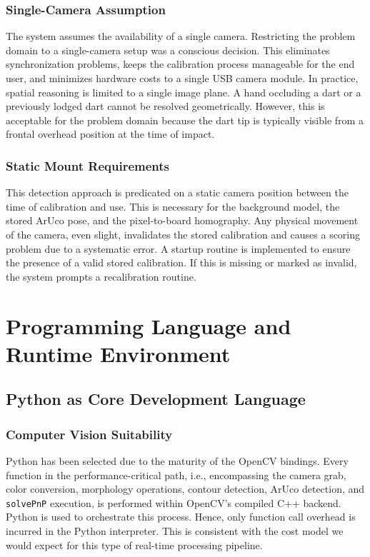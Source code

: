 \subsubsection{Single-Camera Assumption}
The system assumes the availability of a single camera.
Restricting the problem domain to a single-camera setup was a conscious decision. This eliminates synchronization problems, keeps the calibration process manageable for the end user, and minimizes hardware costs to a single USB camera module. In practice, spatial reasoning is limited to a single image plane. A hand occluding a dart or a previously lodged dart cannot be resolved geometrically. However, this is acceptable for the problem domain because the dart tip is typically visible from a frontal overhead position at the time of impact.

\subsubsection{Static Mount Requirements}
This detection approach is predicated on a static camera position between the time of calibration and use. This is necessary for the background model, the stored ArUco pose, and the pixel-to-board homography. Any physical movement of the camera, even slight, invalidates the stored calibration and causes a scoring problem due to a systematic error. A startup routine is implemented to ensure the presence of a valid stored calibration. If this is missing or marked as invalid, the system prompts a recalibration routine.

\section{Programming Language and Runtime Environment}

\subsection{Python as Core Development Language}

\subsubsection{Computer Vision Suitability}
Python has been selected due to the maturity of the OpenCV bindings. Every function in the performance-critical path, i.e., encompassing the camera grab, color conversion, morphology operations, contour detection, ArUco detection, and \texttt{solvePnP} execution, is performed within OpenCV's compiled C++ backend. Python is used to orchestrate this process. Hence, only function call overhead is incurred in the Python interpreter. This is consistent with the cost model we would expect for this type of real-time processing pipeline.


